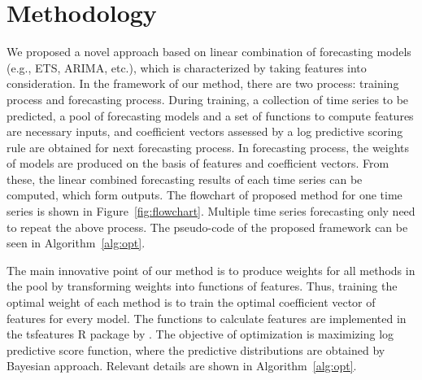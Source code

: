 \documentclass[a4paper,review,11pt,authoryear]{elsarticle}
\begin{document}
\begin{frontmatter}

  \title{}



  \begin{abstract}

  \end{abstract}

  \begin{keyword}

  \end{keyword}

\end{frontmatter}


\newpage
\setcounter{page}{1}


\section{Methodology}
\label{sec:method}

We proposed a novel approach based on linear combination of forecasting models (e.g., ETS, ARIMA, etc.), which is characterized by taking features into consideration. In the framework of our method, there are two process: training process and forecasting process. During training, a collection of time series to be predicted, a pool of forecasting models and a set of functions to compute features are necessary inputs, and coefficient vectors assessed by a log predictive scoring rule \citep{geweke2011optimal} are obtained for next forecasting process. In forecasting process, the weights of models are produced on the basis of features and coefficient vectors. From these, the linear combined forecasting results of each time series can be computed, which form outputs. The flowchart of proposed method for one time series is shown in Figure~\ref{fig:flowchart}. Multiple time series forecasting only need to repeat the above process. The pseudo-code of the proposed framework can be seen in Algorithm~\ref{alg:opt}.

The main innovative point of our method is to produce weights for all methods in the pool by transforming weights into functions of features. Thus, training the optimal weight of each method is to train the optimal coefficient vector of features for every model. The functions to calculate features are implemented in the tsfeatures R package by \cite{hyndman2018tsfeatures}. The objective of optimization is maximizing log predictive score function, where the predictive distributions are obtained by Bayesian approach. Relevant details are shown in Algorithm~\ref{alg:opt}.
\end{document}
